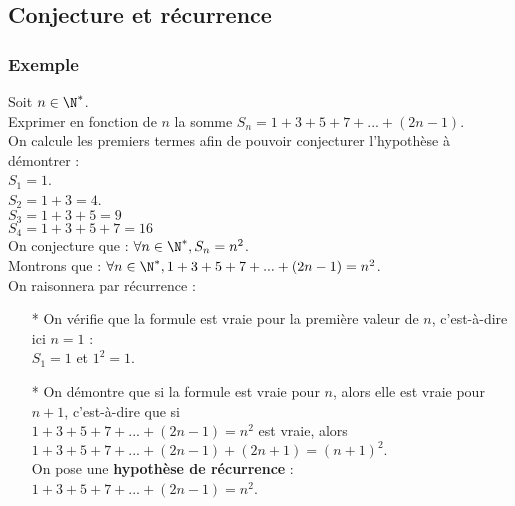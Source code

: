 \subsection{Conjecture et récurrence}

\subsubsection{Exemple }

Soit $n \in \N^*$. \\

Exprimer en fonction de $n$ la somme $S_n = 1 + 3 + 5 + 7 + ... + \left(2n -1\right)$. \\

On calcule les premiers termes afin de pouvoir conjecturer l'hypothèse à démontrer : \\

$S_1 = 1$. \\

$S_2 = 1 + 3 = 4$. \\

$S_3 = 1 + 3 + 5 = 9$ \\

$S_4 = 1 + 3 + 5 + 7 = 16$ \\

On conjecture que : $\forall n \in \N^*, S_n = n^2$. \\

Montrons que : $\forall n \in \N^*, 1 + 3 + 5 + 7 + ... + \left(2n-1\right) = n^2$. \\

On raisonnera par récurrence : \\

\begin{itemize}

\item[*] On vérifie que la formule est vraie pour la première valeur de $n$, c'est-à-dire ici $n = 1$ : \vspace{.3cm} \\ $S_1 = 1$ et $1^2 = 1$. \\

\item[*] On démontre que si la formule est vraie pour $n$, alors elle est vraie pour $n+1$, c'est-à-dire que si \\ $1 + 3 + 5 + 7 + ... + \left(2n-1\right) = n^2$ est vraie, alors $1 + 3 + 5 + 7 + ... + \left(2n-1\right) + \left(2n +1\right) = \left(n+1\right)^2.$ \vspace{.3cm} \\ On pose une \textbf{hypothèse de récurrence} : $1 + 3 + 5 + 7 + ... + \left(2n-1\right) = n^2$.
\end{itemize}

